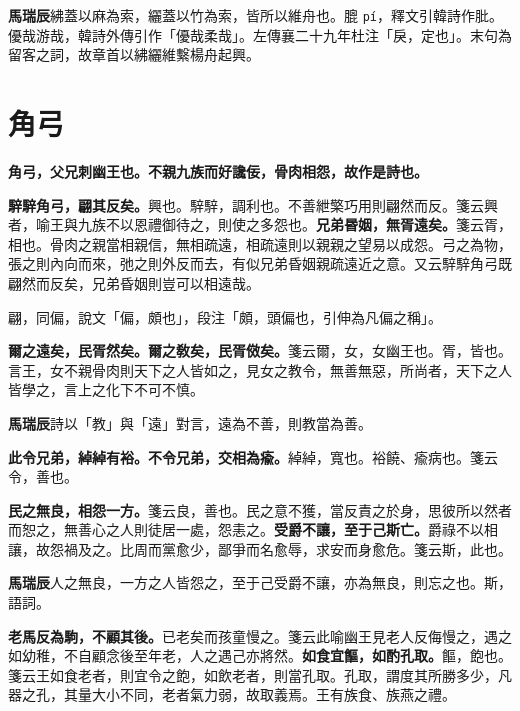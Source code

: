 \begin{quoting}\textbf{馬瑞辰}紼蓋以麻為索，纚蓋以竹為索，皆所以維舟也。膍 \texttt{pí}，釋文引韓詩作肶。優哉游哉，韓詩外傳引作「優哉柔哉」。左傳襄二十九年杜注「戾，定也」。末句為留客之詞，故章首以紼纚維繫楊舟起興。\end{quoting}

\section{角弓}


\textbf{角弓，父兄刺幽王也。不親九族而好讒佞，骨肉相怨，故作是詩也。}

\textbf{騂騂角弓，翩其反矣。}{\footnotesize 興也。騂騂，調利也。不善紲檠巧用則翩然而反。箋云興者，喻王與九族不以恩禮御待之，則使之多怨也。}\textbf{兄弟昬姻，無胥遠矣。}{\footnotesize 箋云胥，相也。骨肉之親當相親信，無相疏遠，相疏遠則以親親之望易以成怨。弓之為物，張之則內向而來，弛之則外反而去，有似兄弟昏姻親疏遠近之意。又云騂騂角弓既翩然而反矣，兄弟昏姻則豈可以相遠哉。}

\begin{quoting}翩，同偏，說文「偏，頗也」，段注「頗，頭偏也，引伸為凡偏之稱」。\end{quoting}

\textbf{爾之遠矣，民胥然矣。爾之敎矣，民胥傚矣。}{\footnotesize 箋云爾，女，女幽王也。胥，皆也。言王，女不親骨肉則天下之人皆如之，見女之教令，無善無惡，所尚者，天下之人皆學之，言上之化下不可不慎。}

\begin{quoting}\textbf{馬瑞辰}詩以「教」與「遠」對言，遠為不善，則教當為善。\end{quoting}

\textbf{此令兄弟，綽綽有裕。不令兄弟，交相為瘉。}{\footnotesize 綽綽，寬也。裕饒、瘉病也。箋云令，善也。}

\textbf{民之無良，相怨一方。}{\footnotesize 箋云良，善也。民之意不獲，當反責之於身，思彼所以然者而恕之，無善心之人則徒居一處，怨恚之。}\textbf{受爵不讓，至于己斯亡。}{\footnotesize 爵祿不以相讓，故怨禍及之。比周而黨愈少，鄙爭而名愈辱，求安而身愈危。箋云斯，此也。}

\begin{quoting}\textbf{馬瑞辰}人之無良，一方之人皆怨之，至于己受爵不讓，亦為無良，則忘之也。斯，語詞。\end{quoting}

\textbf{老馬反為駒，不顧其後。}{\footnotesize 已老矣而孩童慢之。箋云此喻幽王見老人反侮慢之，遇之如幼稚，不自顧念後至年老，人之遇己亦將然。}\textbf{如食宜饇，如酌孔取。}{\footnotesize 饇，飽也。箋云王如食老者，則宜令之飽，如飲老者，則當孔取。孔取，謂度其所勝多少，凡器之孔，其量大小不同，老者氣力弱，故取義焉。王有族食、族燕之禮。}

